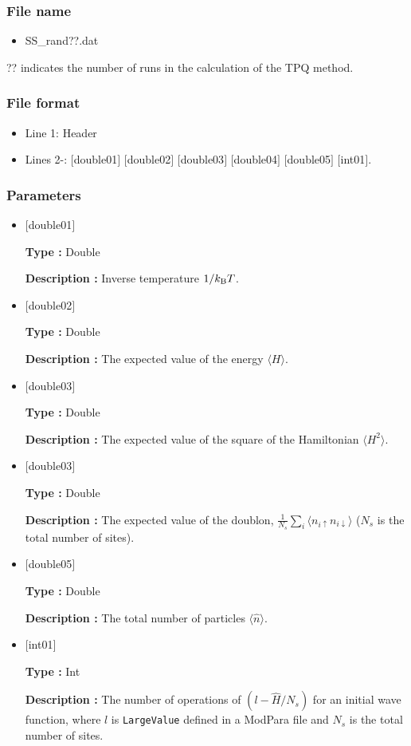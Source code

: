 \subsubsection{File name}
 \begin{itemize}
   \item SS\_rand??.dat
  \end{itemize}
  ?? indicates the number of runs in the calculation of the TPQ method.

\subsubsection{File format}
\begin{itemize}
   \item Line 1: Header
   \item Lines 2-: $[$double01$]$ $[$double02$]$ $[$double03$]$ $[$double04$]$ $[$double05$]$ $[$int01$]$.
  \end{itemize}
\subsubsection{Parameters}
 \begin{itemize}

  \item  $[$double01$]$
  
 {\bf Type :} Double

{\bf Description :} Inverse temperature $1/{k_{\rm B}T}$.
 
  \item $[$double02$]$

 {\bf Type :} Double 

{\bf Description :}  The expected value of the energy $\langle H \rangle$.

  \item $[$double03$]$

 {\bf Type :} Double 

{\bf Description :} The expected value of the square of the Hamiltonian $\langle H^2 \rangle$. 

  \item $[$double03$]$

 {\bf Type :} Double 

{\bf Description :} The expected value of the doublon, 
$\frac{1}{N_s} \sum_{i}\langle n_{i\uparrow}n_{i\downarrow}\rangle$ ($N_{s}$ is the total number of sites).

  \item $[$double05$]$

 {\bf Type :} Double 

{\bf Description :} The total number of particles $\langle {\hat n} \rangle$.


  \item $[$int01$]$

 {\bf Type :} Int 

{\bf Description :} The number of operations of $(l-\hat{H}/N_{s})$ for an initial wave function, where $l$ is \verb|LargeValue| defined in a ModPara file and $N_{s}$ is the total number of sites.

 \end{itemize}

